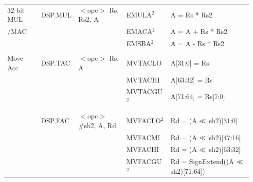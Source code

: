 \begin{table}
\begin{subtable}{\linewidth}
\begin{center}
\begin{tabular}{lllll}
32-bit MUL         & DSP.MUL           & $<$opc$>$ Rs, Rs2, A                  & EMULA$^2$         & A = Rs * Rs2                                                                  \\
/MAC               &                   &                                       & EMACA$^2$         & A = A + Rs * Rs2                                                              \\
                   &                   &                                       & EMSBA$^2$         & A = A - Rs * Rs2                                                              \\
                   &                   &                                       &                   &                                                                               \\
Move Acc           & DSP.TAC           & $<$opc$>$ Rs, A                       & MVTACLO           & A[31:0] = Rs                                                                  \\
                   &                   &                                       & MVTACHI           & A[63:32] = Rs                                                                 \\
                   &                   &                                       & MVTACGU$^2$       & A[71:64] = Rs[7:0]                                                            \\
                   &                   &                                       &                   &                                                                               \\
                   & DSP.FAC           & $<$opc$>$ \#sh2, A, Rd                & MVFACLO$^2$       & Rd = (A $\ll$ sh2)[31:0]                                                     \\
                   &                   &                                       & MVFACMI           & Rd = (A $\ll$ sh2)[47:16]                                                    \\
                   &                   &                                       & MVFACHI           & Rd = (A $\ll$ sh2)[63:32]                                                    \\
                   &                   &                                       & MVFACGU$^2$       & Rd = SignExtend((A $\ll$ sh2)[71:64])                                        \\

\end{tabular}
\end{center}
\end{subtable}
\end{table}
